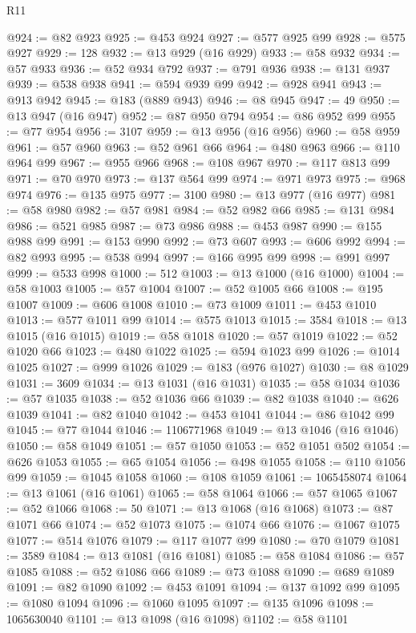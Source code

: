 \begin{lexlean}{R11}
\begin{coremodule}
@924 := @82 @923
@925 := @453 @924
@927 := @577 @925 @99
@928 := @575 @927
@929 := 128
@932 := @13 @929 (@16 @929)
@933 := @58 @932
@934 := @57 @933
@936 := @52 @934 @792
@937 := @791 @936
@938 := @131 @937
@939 := @538 @938
@941 := @594 @939 @99
@942 := @928 @941
@943 := @913 @942
@945 := @183 (@889 @943)
@946 := @8 @945
@947 := 49
@950 := @13 @947 (@16 @947)
@952 := @87 @950 @794
@954 := @86 @952 @99
@955 := @77 @954
@956 := 3107
@959 := @13 @956 (@16 @956)
@960 := @58 @959
@961 := @57 @960
@963 := @52 @961 @66
@964 := @480 @963
@966 := @110 @964 @99
@967 := @955 @966
@968 := @108 @967
@970 := @117 @813 @99
@971 := @70 @970
@973 := @137 @564 @99
@974 := @971 @973
@975 := @968 @974
@976 := @135 @975
@977 := 3100
@980 := @13 @977 (@16 @977)
@981 := @58 @980
@982 := @57 @981
@984 := @52 @982 @66
@985 := @131 @984
@986 := @521 @985
@987 := @73 @986
@988 := @453 @987
@990 := @155 @988 @99
@991 := @153 @990
@992 := @73 @607
@993 := @606 @992
@994 := @82 @993
@995 := @538 @994
@997 := @166 @995 @99
@998 := @991 @997
@999 := @533 @998
@1000 := 512
@1003 := @13 @1000 (@16 @1000)
@1004 := @58 @1003
@1005 := @57 @1004
@1007 := @52 @1005 @66
@1008 := @195 @1007
@1009 := @606 @1008
@1010 := @73 @1009
@1011 := @453 @1010
@1013 := @577 @1011 @99
@1014 := @575 @1013
@1015 := 3584
@1018 := @13 @1015 (@16 @1015)
@1019 := @58 @1018
@1020 := @57 @1019
@1022 := @52 @1020 @66
@1023 := @480 @1022
@1025 := @594 @1023 @99
@1026 := @1014 @1025
@1027 := @999 @1026
@1029 := @183 (@976 @1027)
@1030 := @8 @1029
@1031 := 3609
@1034 := @13 @1031 (@16 @1031)
@1035 := @58 @1034
@1036 := @57 @1035
@1038 := @52 @1036 @66
@1039 := @82 @1038
@1040 := @626 @1039
@1041 := @82 @1040
@1042 := @453 @1041
@1044 := @86 @1042 @99
@1045 := @77 @1044
@1046 := 1106771968
@1049 := @13 @1046 (@16 @1046)
@1050 := @58 @1049
@1051 := @57 @1050
@1053 := @52 @1051 @502
@1054 := @626 @1053
@1055 := @65 @1054
@1056 := @498 @1055
@1058 := @110 @1056 @99
@1059 := @1045 @1058
@1060 := @108 @1059
@1061 := 1065458074
@1064 := @13 @1061 (@16 @1061)
@1065 := @58 @1064
@1066 := @57 @1065
@1067 := @52 @1066
@1068 := 50
@1071 := @13 @1068 (@16 @1068)
@1073 := @87 @1071 @66
@1074 := @52 @1073
@1075 := @1074 @66
@1076 := @1067 @1075
@1077 := @514 @1076
@1079 := @117 @1077 @99
@1080 := @70 @1079
@1081 := 3589
@1084 := @13 @1081 (@16 @1081)
@1085 := @58 @1084
@1086 := @57 @1085
@1088 := @52 @1086 @66
@1089 := @73 @1088
@1090 := @689 @1089
@1091 := @82 @1090
@1092 := @453 @1091
@1094 := @137 @1092 @99
@1095 := @1080 @1094
@1096 := @1060 @1095
@1097 := @135 @1096
@1098 := 1065630040
@1101 := @13 @1098 (@16 @1098)
@1102 := @58 @1101

\end{coremodule}
\end{lexlean}
